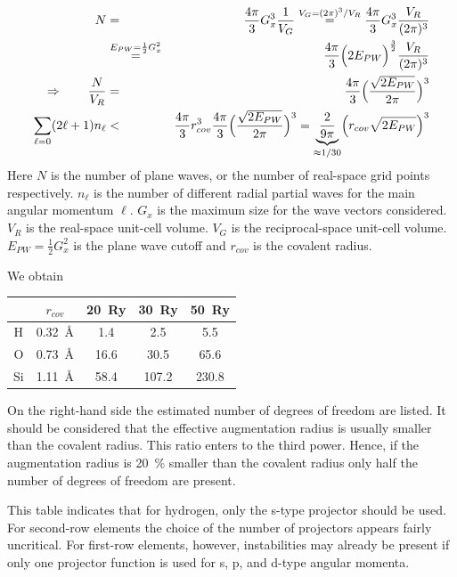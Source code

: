 \documentclass[final,12pt]{article}
\begin{document}
{{{{{{\begin{eqnarray}
N&=&\frac{4\pi}{3}G_x^3\frac{1}{V_G}
\stackrel{V_G=(2\pi)^3/V_R}{=}
\frac{4\pi}{3}G_x^3\frac{V_R}{(2\pi)^3}
\nonumber\\
&\stackrel{E_{PW}=\frac{1}{2}G_x^2}{=}&
\frac{4\pi}{3}\Bigl(2 E_{PW}\Bigr)^\frac{3}{2}\frac{V_R}{(2\pi)^3}
\nonumber\\
\Rightarrow\qquad
\frac{N}{V_R}&=&\frac{4\pi}{3}\Bigl(
\frac{\sqrt{2E_{PW}}}{2\pi}
\Bigr)^3
\nonumber\\
\sum_{\ell=0}(2\ell+1)n_\ell&<&
\frac{4\pi}{3}r_{cov}^3\frac{4\pi}{3}\Bigl(
\frac{\sqrt{2E_{PW}}}{2\pi}
\Bigr)^3
=\underbrace{\frac{2}{9\pi}}_{\approx 1/30}\Bigl(r_{cov}\sqrt{2E_{PW}}\Bigr)^3
\end{eqnarray}
Here $N$ is the number of plane waves, or the number of real-space
grid points respectively. $n_\ell$ is the number of different radial
partial waves for the main angular momentum $\ell$.  $G_x$ is the
maximum size for the wave vectors considered. $V_R$ is the real-space
unit-cell volume. $V_G$ is the reciprocal-space unit-cell
volume. $E_{PW}=\frac{1}{2}G_x^2$ is the plane wave cutoff and
$r_{cov}$ is the covalent radius.


We obtain
\begin{center}
\begin{tabular}{|c|c|c|c|c|}
\hline
  &$r_{cov}$ & 20~Ry & 30~Ry & 50~Ry\\
\hline
H & 0.32~\AA &  1.4 & 2.5  &  5.5\\
O & 0.73~\AA & 16.6 & 30.5 & 65.6\\ 
Si& 1.11~\AA & 58.4 & 107.2 & 230.8\\
\hline
\end{tabular}
\end{center}
On the right-hand side the estimated number of degrees of freedom are
listed. It should be considered that the effective augmentation radius
is usually smaller than the covalent radius. This ratio enters to the
third power. Hence, if the augmentation radius is 20~\% smaller than
the covalent radius only half the number of degrees of freedom are
present.

This table indicates that for hydrogen, only the s-type projector
should be used. For second-row elements the choice of the number of
projectors appears fairly uncritical. For first-row elements, however,
instabilities may already be present if only one projector function
is used for s, p, and d-type angular momenta.


\newpage
}}}}}}
\end{document}
